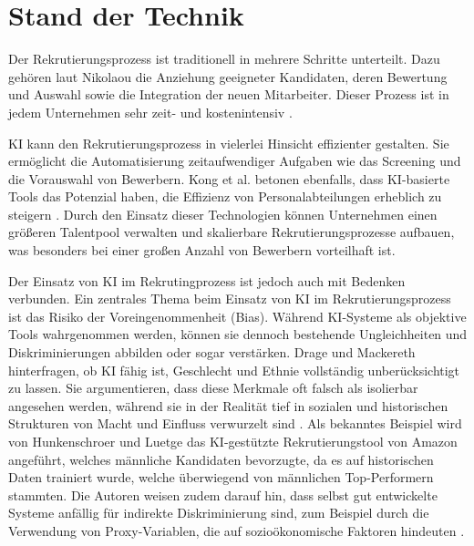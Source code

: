 
\chapter{Stand der Technik}
Der Rekrutierungsprozess ist traditionell in mehrere Schritte unterteilt. Dazu gehören laut Nikolaou die Anziehung geeigneter Kandidaten, deren Bewertung und Auswahl sowie die Integration der neuen Mitarbeiter. Dieser Prozess ist in jedem Unternehmen sehr zeit- und kostenintensiv \cite{nikolaou:2021}. 

\acs{KI} kann den Rekrutierungsprozess in vielerlei Hinsicht effizienter gestalten. Sie ermöglicht die Automatisierung zeitaufwendiger Aufgaben wie das Screening und die Vorauswahl von Bewerbern. Kong et al. betonen ebenfalls, dass KI-basierte Tools das Potenzial haben, die Effizienz von Personalabteilungen erheblich zu steigern \cite{kong:2021}. Durch den Einsatz dieser Technologien können Unternehmen einen größeren Talentpool verwalten und skalierbare Rekrutierungsprozesse aufbauen, was besonders bei einer großen Anzahl von Bewerbern vorteilhaft ist.

Der Einsatz von \acs{KI} im Rekrutingprozess ist jedoch auch mit Bedenken verbunden. Ein zentrales Thema beim Einsatz von \acs{KI} im Rekrutierungsprozess ist das Risiko der Voreingenommenheit (Bias). Während \acs{KI}-Systeme als objektive Tools wahrgenommen werden, können sie dennoch bestehende Ungleichheiten und Diskriminierungen abbilden oder sogar verstärken. Drage und Mackereth hinterfragen, ob \acs{KI} fähig ist, Geschlecht und Ethnie vollständig unberücksichtigt zu lassen. Sie argumentieren, dass diese Merkmale oft falsch als isolierbar angesehen werden, während sie in der Realität tief in sozialen und historischen Strukturen von Macht und Einfluss verwurzelt sind \cite{drage:2022}. Als bekanntes Beispiel wird von Hunkenschroer und Luetge das \acs{KI}-gestützte Rekrutierungstool von Amazon angeführt, welches männliche Kandidaten bevorzugte, da es auf historischen Daten trainiert wurde, welche überwiegend von männlichen Top-Performern stammten. Die Autoren weisen zudem darauf hin, dass selbst gut entwickelte Systeme anfällig für indirekte Diskriminierung sind, zum Beispiel durch die Verwendung von Proxy-Variablen, die auf sozioökonomische Faktoren hindeuten \cite{hunkenschroer:2022}.

